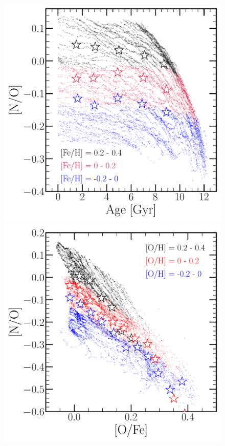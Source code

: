 \documentclass[ms.tex]{subfiles}
\begin{document}
\begin{figure} 
\centering 
\includegraphics[scale = 0.3]{no_vs_age.pdf} 
\includegraphics[scale = 0.3]{no_vs_ofe.pdf} 

\end{figure}
\end{document}
